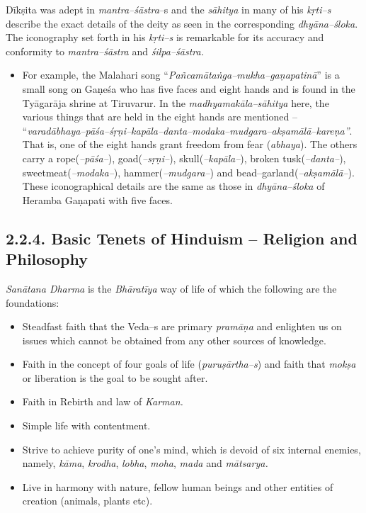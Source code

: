 Dīkṣita was adept in \textit{mantra–śāstra}–s and the \textit{sāhitya} in many of his \textit{kṛti–s} describe the exact details of the deity as seen in the corresponding \textit{dhyāna–śloka}. The iconography set forth in his \textit{kṛti–s} is remarkable for its accuracy and conformity to \textit{mantra–śāstra} and \textit{śilpa–śāstra.}

\begin{itemize}
\item For example, the Malahari song “\textit{Pañcamātaṅga–mukha–gaṇapatinā}” is a small song on Gaṇeśa who has five faces and eight hands and is found in the Tyāgarāja shrine at Tiruvarur. In the \textit{madhyamakāla–sāhitya} here, the various things that are held in the eight hands are mentioned – “\textit{varadābhaya–pāśa–śṛṇi–kapāla–danta–modaka–mudgara–akṣamālā–kareṇa”}. That is, one of the eight hands grant freedom from fear (\textit{abhaya}). The others carry a rope(\textit{–pāśa–}), goad(\textit{–sṛṇi–}), skull(\textit{–kapāla–}), broken tusk(\textit{–danta–}), sweetmeat(\textit{–modaka–}), hammer(\textit{–mudgara–}) and bead–garland(\textit{–akṣamālā–}). These iconographical details are the same as those in \textit{dhyāna–śloka} of Heramba Gaṇapati with five faces.

\end{itemize}



\subsection*{2.2.4. Basic Tenets of Hinduism – Religion and Philosophy}

\textit{Sanātana Dharma} is the \textit{Bhāratīya} way of life of which the following are the foundations:

\begin{itemize}
\item Steadfast faith that the Veda–s are primary \textit{pramāṇa} and enlighten us on issues which cannot be obtained from any other sources of knowledge.

 \item Faith in the concept of four goals of life (\textit{puruṣārtha–s}) and faith that \textit{mokṣa} or liberation is the goal to be sought after.

 \item Faith in Rebirth and law of \textit{Karman.}

 \item Simple life with contentment.

 \item Strive to achieve purity of one’s mind, which is devoid of six internal enemies, namely, \textit{kāma}, \textit{krodha}, \textit{lobha}, \textit{moha}, \textit{mada} and \textit{mātsarya.}

 \item Live in harmony with nature, fellow human beings and other entities of creation (animals, plants etc).

\end{itemize}

